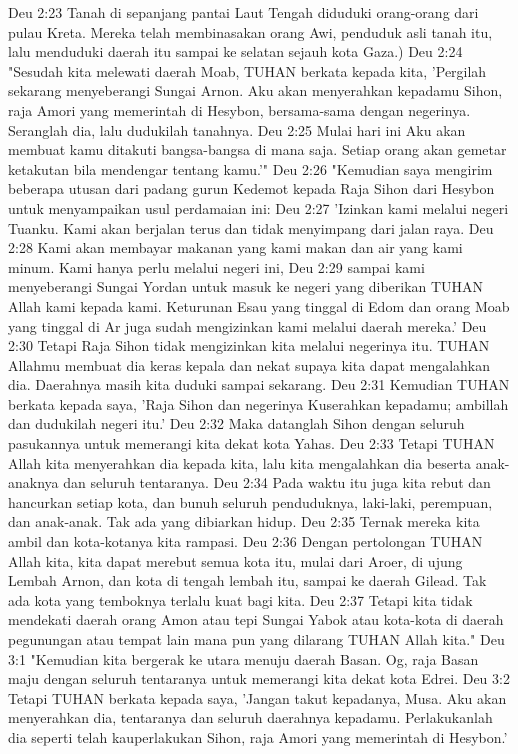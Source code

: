 Deu 2:23  Tanah di sepanjang pantai Laut Tengah diduduki orang-orang dari pulau Kreta. Mereka telah membinasakan orang Awi, penduduk asli tanah itu, lalu menduduki daerah itu sampai ke selatan sejauh kota Gaza.)
Deu 2:24  "Sesudah kita melewati daerah Moab, TUHAN berkata kepada kita, 'Pergilah sekarang menyeberangi Sungai Arnon. Aku akan menyerahkan kepadamu Sihon, raja Amori yang memerintah di Hesybon, bersama-sama dengan negerinya. Seranglah dia, lalu dudukilah tanahnya.
Deu 2:25  Mulai hari ini Aku akan membuat kamu ditakuti bangsa-bangsa di mana saja. Setiap orang akan gemetar ketakutan bila mendengar tentang kamu.'"
Deu 2:26  "Kemudian saya mengirim beberapa utusan dari padang gurun Kedemot kepada Raja Sihon dari Hesybon untuk menyampaikan usul perdamaian ini:
Deu 2:27  'Izinkan kami melalui negeri Tuanku. Kami akan berjalan terus dan tidak menyimpang dari jalan raya.
Deu 2:28  Kami akan membayar makanan yang kami makan dan air yang kami minum. Kami hanya perlu melalui negeri ini,
Deu 2:29  sampai kami menyeberangi Sungai Yordan untuk masuk ke negeri yang diberikan TUHAN Allah kami kepada kami. Keturunan Esau yang tinggal di Edom dan orang Moab yang tinggal di Ar juga sudah mengizinkan kami melalui daerah mereka.'
Deu 2:30  Tetapi Raja Sihon tidak mengizinkan kita melalui negerinya itu. TUHAN Allahmu membuat dia keras kepala dan nekat supaya kita dapat mengalahkan dia. Daerahnya masih kita duduki sampai sekarang.
Deu 2:31  Kemudian TUHAN berkata kepada saya, 'Raja Sihon dan negerinya Kuserahkan kepadamu; ambillah dan dudukilah negeri itu.'
Deu 2:32  Maka datanglah Sihon dengan seluruh pasukannya untuk memerangi kita dekat kota Yahas.
Deu 2:33  Tetapi TUHAN Allah kita menyerahkan dia kepada kita, lalu kita mengalahkan dia beserta anak-anaknya dan seluruh tentaranya.
Deu 2:34  Pada waktu itu juga kita rebut dan hancurkan setiap kota, dan bunuh seluruh penduduknya, laki-laki, perempuan, dan anak-anak. Tak ada yang dibiarkan hidup.
Deu 2:35  Ternak mereka kita ambil dan kota-kotanya kita rampasi.
Deu 2:36  Dengan pertolongan TUHAN Allah kita, kita dapat merebut semua kota itu, mulai dari Aroer, di ujung Lembah Arnon, dan kota di tengah lembah itu, sampai ke daerah Gilead. Tak ada kota yang temboknya terlalu kuat bagi kita.
Deu 2:37  Tetapi kita tidak mendekati daerah orang Amon atau tepi Sungai Yabok atau kota-kota di daerah pegunungan atau tempat lain mana pun yang dilarang TUHAN Allah kita."
Deu 3:1  "Kemudian kita bergerak ke utara menuju daerah Basan. Og, raja Basan maju dengan seluruh tentaranya untuk memerangi kita dekat kota Edrei.
Deu 3:2  Tetapi TUHAN berkata kepada saya, 'Jangan takut kepadanya, Musa. Aku akan menyerahkan dia, tentaranya dan seluruh daerahnya kepadamu. Perlakukanlah dia seperti telah kauperlakukan Sihon, raja Amori yang memerintah di Hesybon.'
